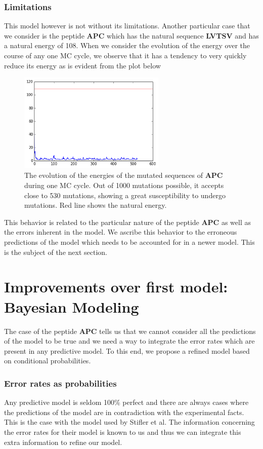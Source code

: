 \documentclass[a4paper, 12pt]{article}
\begin{document}
 	\section{Limitations}

 	This model however is not without its limitations. Another particular case that we consider is the peptide \textbf{APC} which has the natural sequence \textbf{LVTSV} and has a natural energy of 108. When we consider the evolution of the energy over the course of any one MC cycle, we observe that it has a tendency to very quickly reduce its energy as is evident from the plot below

 	\begin{figure}[!h]
 	\label{apc_evol}
 	\centering
 	\includegraphics[width=7cm]{Images/apc_evol.png} 
 	\caption{The evolution of the energies of the mutated sequences of \textbf{APC} during one MC cycle. Out of 1000 mutations possible, it accepts close to 530 mutations, showing a great susceptibility to undergo mutations. Red line shows the natural energy.}
 	\end{figure} 

 	This behavior is related to the particular nature of the peptide \textbf{APC} as well as the errors inherent in the model. We ascribe this behavior to the erroneous predictions of the model which needs to be accounted for in a newer model. This is the subject of the next section. 
\pagebreak
\part{Improvements over first model: Bayesian Modeling}
	
	The case of the peptide \textbf{APC} tells us that we cannot consider all the predictions of the model to be true and we need a way to integrate the error rates which are present in any predictive model. To this end, we propose a refined model based on conditional probabilities.
\section{Error rates as probabilities}
	Any predictive model is seldom 100\% perfect and there are always cases where the predictions of the model are in contradiction with the experimental facts. This is the case with the model used by Stifler et al. The information concerning the error rates for their model is known to us and thus we can integrate this extra information to refine our model. 
\end{document}

